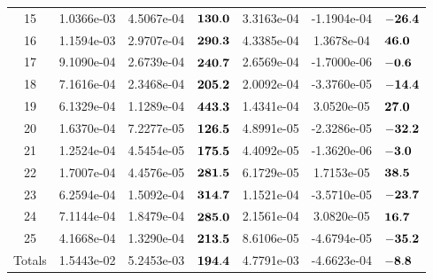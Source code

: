 \documentclass[t, pdftex]{beamer}
\begin{document}
\begin{frame}
\begin{table}[h]
\begin{center}
\begin{tabular}[h]{|c|c|c|M|c|c|M|}
 15  & 1.0366e-03 & 4.5067e-04  & $\bf{130.0 }$  & 3.3163e-04 & -1.1904e-04 & $\bf{ -26.4}$ \\
 16  & 1.1594e-03 & 2.9707e-04  & $\bf{290.3 }$  & 4.3385e-04 & 1.3678e-04 & $\bf{ 46.0 }$ \\
 17  & 9.1090e-04 & 2.6739e-04  & $\bf{240.7 }$  & 2.6569e-04 & -1.7000e-06 & $\bf{ -0.6}$ \\
 18  & 7.1616e-04 & 2.3468e-04  & $\bf{205.2 }$  & 2.0092e-04 & -3.3760e-05 & $\bf{ -14.4}$ \\
 19  & 6.1329e-04 & 1.1289e-04  & $\bf{443.3 }$  & 1.4341e-04 & 3.0520e-05 & $\bf{ 27.0 }$ \\
 20  & 1.6370e-04 & 7.2277e-05  & $\bf{126.5 }$  & 4.8991e-05 & -2.3286e-05 & $\bf{ -32.2}$ \\
 21  & 1.2524e-04 & 4.5454e-05  & $\bf{175.5 }$  & 4.4092e-05 & -1.3620e-06 & $\bf{ -3.0}$ \\
 22  & 1.7007e-04 & 4.4576e-05  & $\bf{281.5 }$  & 6.1729e-05 & 1.7153e-05 & $\bf{ 38.5 }$ \\
 23  & 6.2594e-04 & 1.5092e-04  & $\bf{314.7 }$  & 1.1521e-04 & -3.5710e-05 & $\bf{ -23.7}$ \\
 24  & 7.1144e-04 & 1.8479e-04  & $\bf{285.0 }$  & 2.1561e-04 & 3.0820e-05 & $\bf{ 16.7 }$ \\
 25  & 4.1668e-04 & 1.3290e-04  & $\bf{213.5 }$  & 8.6106e-05 & -4.6794e-05 & $\bf{ -35.2}$ \\
            \hline \hline
Totals & 1.5443e-02 & 5.2453e-03 & {\scriptsize \color{utred}$\bf{194.4}$} & 4.7791e-03 & -4.6623e-04   & {\scriptsize \color{utred}$\bf{-8.8}$} \\
            \hline
        \end{tabular}
        \label{tab:loo_crud_bmass}
    \end{center}
\end{table}
\end{frame}
\end{document}
